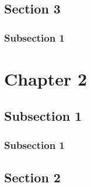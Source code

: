 \documentclass[10pt, a4paper, oneside]{report}
\begin{document}
      \paragraph{}
      \paragraph{}
      \paragraph{}
  \section{Section 3}
    \subsection{Subsection 1}
      \paragraph{}
      \paragraph{}
      \paragraph{}

\chapter{Chapter 2}
  \section{Subsection 1}
    \subsection{Subsection 1}
      \paragraph{}
      \paragraph{}
      \paragraph{}
  \section{Section 2}
\end{document}
